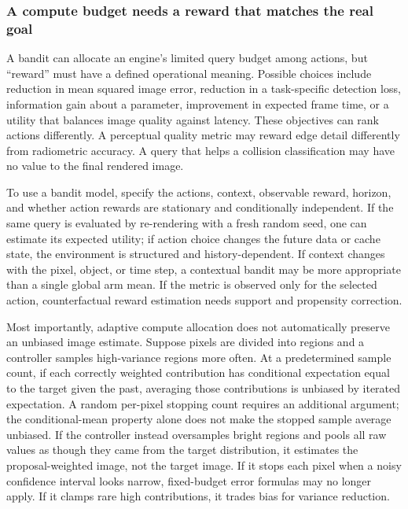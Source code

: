 \subsubsection{A compute budget needs a reward that matches the real goal}\label{a-compute-budget-needs-a-reward-that-matches-the-real-goal}

A bandit can allocate an engine's limited query budget among actions, but ``reward'' must have a defined operational meaning. Possible choices include reduction in mean squared image error, reduction in a task-specific detection loss, information gain about a parameter, improvement in expected frame time, or a utility that balances image quality against latency. These objectives can rank actions differently. A perceptual quality metric may reward edge detail differently from radiometric accuracy. A query that helps a collision classification may have no value to the final rendered image.

To use a bandit model, specify the actions, context, observable reward, horizon, and whether action rewards are stationary and conditionally independent. If the same query is evaluated by re-rendering with a fresh random seed, one can estimate its expected utility; if action choice changes the future data or cache state, the environment is structured and history-dependent. If context changes with the pixel, object, or time step, a contextual bandit may be more appropriate than a single global arm mean. If the metric is observed only for the selected action, counterfactual reward estimation needs support and propensity correction.

Most importantly, adaptive compute allocation does not automatically preserve an unbiased image estimate. Suppose pixels are divided into regions and a controller samples high-variance regions more often. At a predetermined sample count, if each correctly weighted contribution has conditional expectation equal to the target given the past, averaging those contributions is unbiased by iterated expectation. A random per-pixel stopping count requires an additional argument; the conditional-mean property alone does not make the stopped sample average unbiased. If the controller instead oversamples bright regions and pools all raw values as though they came from the target distribution, it estimates the proposal-weighted image, not the target image. If it stops each pixel when a noisy confidence interval looks narrow, fixed-budget error formulas may no longer apply. If it clamps rare high contributions, it trades bias for variance reduction.

